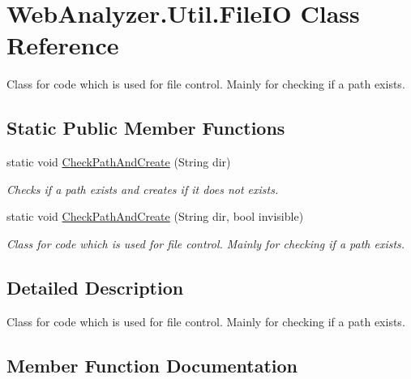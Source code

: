 \hypertarget{class_web_analyzer_1_1_util_1_1_file_i_o}{}\section{Web\+Analyzer.\+Util.\+File\+I\+O Class Reference}
\label{class_web_analyzer_1_1_util_1_1_file_i_o}


Class for code which is used for file control. Mainly for checking if a path exists.  


\subsection*{Static Public Member Functions}
\begin{DoxyCompactItemize}
\item 
static void \hyperlink{class_web_analyzer_1_1_util_1_1_file_i_o_ad29b58f857dbb1f0084548518e61d9bb}{Check\+Path\+And\+Create} (String dir)
\begin{DoxyCompactList}\small\item\em Checks if a path exists and creates if it does not exists. \end{DoxyCompactList}\item 
static void \hyperlink{class_web_analyzer_1_1_util_1_1_file_i_o_a4f03d9480d833f023ac6ca98ee2636c9}{Check\+Path\+And\+Create} (String dir, bool invisible)
\begin{DoxyCompactList}\small\item\em Class for code which is used for file control. Mainly for checking if a path exists. \end{DoxyCompactList}\end{DoxyCompactItemize}


\subsection{Detailed Description}
Class for code which is used for file control. Mainly for checking if a path exists. 



\subsection{Member Function Documentation}
\hypertarget{class_web_analyzer_1_1_util_1_1_file_i_o_ad29b58f857dbb1f0084548518e61d9bb}{}
